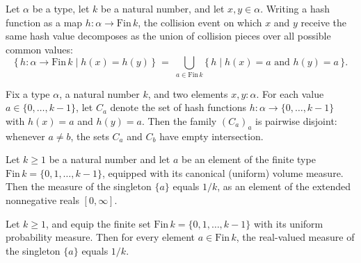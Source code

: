 \begin{lemma}
\label{CommunicationComplexity.Functions.Hash.collision_mem_iUnion}
\leanok
{}
Let $\alpha$ be a type, let $k$ be a natural number, and let $x, y \in \alpha$. Writing
a hash function as a map $h : \alpha \to \mathrm{Fin}\,k$, the collision event on which
$x$ and $y$ receive the same hash value decomposes as the union of collision pieces over
all possible common values:
\[
  \{\, h : \alpha \to \mathrm{Fin}\,k \mid h(x) = h(y) \,\}
  \;=\; \bigcup_{a \in \mathrm{Fin}\,k} \{\, h \mid h(x) = a \text{ and } h(y) = a \,\}.
\]
\end{lemma}

\begin{lemma}
\label{CommunicationComplexity.Functions.Hash.collisionPiece_pairwiseDisjoint}
\leanok
{}
Fix a type $\alpha$, a natural number $k$, and two elements $x, y : \alpha$. For each
value $a \in \{0, \dots, k-1\}$, let $C_a$ denote the set of hash functions $h : \alpha
\to \{0, \dots, k-1\}$ with $h(x) = a$ and $h(y) = a$. Then the family $(C_a)_a$ is
pairwise disjoint: whenever $a \ne b$, the sets $C_a$ and $C_b$ have empty intersection.
\end{lemma}

\begin{lemma}
\label{CommunicationComplexity.Functions.Hash.hashRange_singleton_measure}
\leanok
{}
Let $k \ge 1$ be a natural number and let $a$ be an element of the finite type
$\mathrm{Fin}\,k = \{0, 1, \dots, k-1\}$, equipped with its canonical (uniform) volume
measure. Then the measure of the singleton $\{a\}$ equals $1/k$, as an element of the
extended nonnegative reals $[0, \infty]$.
\end{lemma}

\begin{lemma}
\label{CommunicationComplexity.Functions.Hash.hashRange_singleton_measureReal}
\leanok
{}
Let $k \ge 1$, and equip the finite set $\mathrm{Fin}\,k = \{0, 1, \dots, k-1\}$ with
its uniform probability measure. Then for every element $a \in \mathrm{Fin}\,k$, the
real-valued measure of the singleton $\{a\}$ equals $1/k$.
\end{lemma}

